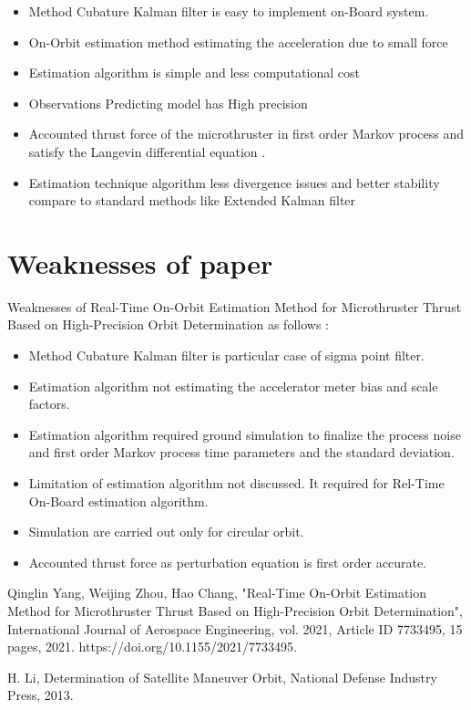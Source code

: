 \documentclass[conference]{IEEEtran}
\begin{document}
\begin{itemize}
\item Method Cubature Kalman filter is easy to implement on-Board system.
\item On-Orbit estimation method estimating the acceleration due to small force
\item Estimation algorithm is simple and less computational cost
\item Observations Predicting model has High precision 
\item Accounted thrust force  of the microthruster in first order Markov process
and satisfy the Langevin differential equation \cite{b2}.
\item Estimation technique algorithm less divergence issues and better stability compare to standard methods like Extended Kalman filter
           
 
\end{itemize}

\section{Weaknesses of paper \cite{b1}}
Weaknesses of Real-Time On-Orbit Estimation Method for Microthruster Thrust Based on High-Precision Orbit Determination as follows :
\begin{itemize}
\item Method Cubature Kalman filter is particular case of sigma point filter.
\item Estimation algorithm not estimating the accelerator meter bias and scale factors. 
\item Estimation algorithm required ground simulation to finalize the process noise and first order Markov process time parameters and the standard deviation.
\item Limitation of estimation algorithm not discussed. It required for Rel-Time On-Board estimation algorithm. 
\item Simulation are carried out only for circular orbit.
\item Accounted thrust force as perturbation equation is first order accurate.  
\end{itemize}


\begin{thebibliography}{00}
	
 Qinglin Yang, Weijing Zhou, Hao Chang, "Real-Time On-Orbit Estimation Method for Microthruster Thrust Based on High-Precision Orbit Determination", International Journal of Aerospace Engineering, vol. 2021, Article ID 7733495, 15 pages, 2021. https://doi.org/10.1155/2021/7733495.

 H. Li, Determination of Satellite Maneuver Orbit, National Defense Industry Press, 2013.

\end{thebibliography}
\end{document}
